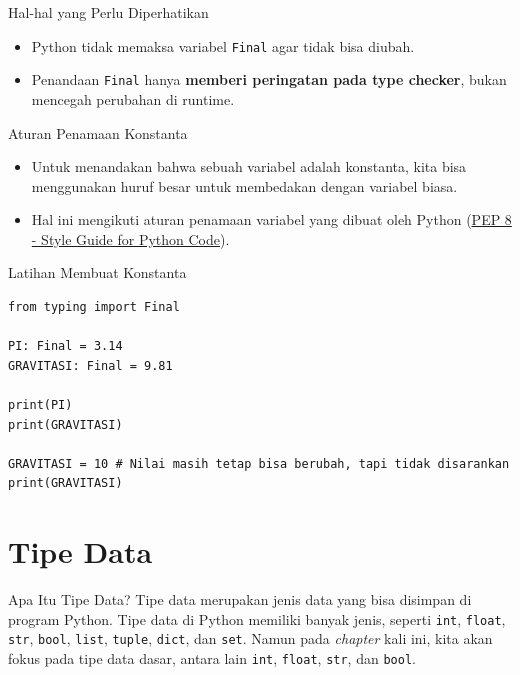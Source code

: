 \documentclass[aspectratio=169, table]{beamer}
\begin{document}
\begin{frame}{Hal-hal yang Perlu Diperhatikan}
\begin{itemize}
\item Python tidak memaksa variabel \texttt{Final} agar tidak bisa diubah.
\item Penandaan \texttt{Final} hanya \textbf{memberi peringatan pada type checker}, bukan mencegah perubahan di runtime.
\end{itemize}
\end{frame} 

\begin{frame}{Aturan Penamaan Konstanta}
\begin{itemize}
\item Untuk menandakan bahwa sebuah variabel adalah konstanta, kita bisa menggunakan huruf besar untuk membedakan dengan variabel biasa.
\item Hal ini mengikuti aturan penamaan variabel yang dibuat oleh Python (\href{https://peps.python.org/pep-0008/}{PEP 8 - Style Guide for Python Code}).
\end{itemize}
\end{frame}

\begin{frame}[fragile]{Latihan Membuat Konstanta}
\begin{lstlisting}[style=PythonStyle, caption={Kode Python: constant.py}]
from typing import Final

PI: Final = 3.14
GRAVITASI: Final = 9.81

print(PI)
print(GRAVITASI)

GRAVITASI = 10 # Nilai masih tetap bisa berubah, tapi tidak disarankan
print(GRAVITASI)
\end{lstlisting}
\end{frame}

\section{Tipe Data}
\begin{frame}{Apa Itu Tipe Data?}
Tipe data merupakan jenis data yang bisa disimpan di program Python. Tipe data di Python memiliki banyak jenis, seperti \texttt{int}, \texttt{float}, \texttt{str}, \texttt{bool}, \texttt{list}, \texttt{tuple}, \texttt{dict}, dan \texttt{set}. Namun pada \textit{chapter} kali ini, kita akan fokus pada tipe data dasar, antara lain \texttt{int}, \texttt{float}, \texttt{str}, dan \texttt{bool}.
\end{frame}
\end{document}

